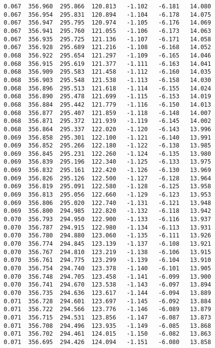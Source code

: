 \begin{verbatim}
   0.067  356.960  295.866  120.813   -1.102   -6.181   14.080
   0.067  356.954  295.831  120.894   -1.104   -6.178   14.075
   0.067  356.947  295.795  120.974   -1.105   -6.176   14.069
   0.067  356.941  295.760  121.055   -1.106   -6.173   14.063
   0.067  356.935  295.725  121.136   -1.107   -6.171   14.058
   0.067  356.928  295.689  121.216   -1.108   -6.168   14.052
   0.068  356.922  295.654  121.297   -1.109   -6.165   14.046
   0.068  356.915  295.619  121.377   -1.111   -6.163   14.041
   0.068  356.909  295.583  121.458   -1.112   -6.160   14.035
   0.068  356.903  295.548  121.538   -1.113   -6.158   14.030
   0.068  356.896  295.513  121.618   -1.114   -6.155   14.024
   0.068  356.890  295.478  121.699   -1.115   -6.153   14.019
   0.068  356.884  295.442  121.779   -1.116   -6.150   14.013
   0.068  356.877  295.407  121.859   -1.118   -6.148   14.007
   0.068  356.871  295.372  121.939   -1.119   -6.145   14.002
   0.068  356.864  295.337  122.020   -1.120   -6.143   13.996
   0.069  356.858  295.301  122.100   -1.121   -6.140   13.991
   0.069  356.852  295.266  122.180   -1.122   -6.138   13.985
   0.069  356.845  295.231  122.260   -1.124   -6.135   13.980
   0.069  356.839  295.196  122.340   -1.125   -6.133   13.975
   0.069  356.832  295.161  122.420   -1.126   -6.130   13.969
   0.069  356.826  295.126  122.500   -1.127   -6.128   13.964
   0.069  356.819  295.091  122.580   -1.128   -6.125   13.958
   0.069  356.813  295.056  122.660   -1.129   -6.123   13.953
   0.069  356.806  295.020  122.740   -1.131   -6.121   13.948
   0.069  356.800  294.985  122.820   -1.132   -6.118   13.942
   0.070  356.793  294.950  122.900   -1.133   -6.116   13.937
   0.070  356.787  294.915  122.980   -1.134   -6.113   13.931
   0.070  356.780  294.880  123.060   -1.135   -6.111   13.926
   0.070  356.774  294.845  123.139   -1.137   -6.108   13.921
   0.070  356.767  294.810  123.219   -1.138   -6.106   13.915
   0.070  356.761  294.775  123.299   -1.139   -6.104   13.910
   0.070  356.754  294.740  123.378   -1.140   -6.101   13.905
   0.070  356.748  294.705  123.458   -1.141   -6.099   13.900
   0.070  356.741  294.670  123.538   -1.143   -6.097   13.894
   0.070  356.735  294.636  123.617   -1.144   -6.094   13.889
   0.071  356.728  294.601  123.697   -1.145   -6.092   13.884
   0.071  356.722  294.566  123.776   -1.146   -6.089   13.879
   0.071  356.715  294.531  123.856   -1.147   -6.087   13.873
   0.071  356.708  294.496  123.935   -1.149   -6.085   13.868
   0.071  356.702  294.461  124.015   -1.150   -6.082   13.863
   0.071  356.695  294.426  124.094   -1.151   -6.080   13.858

\end{verbatim}
